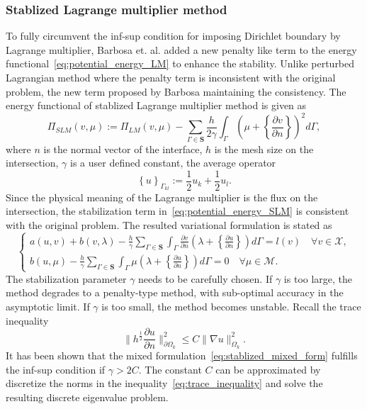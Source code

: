 \documentclass[preprint,12pt]{elsarticle}
\begin{document}
\subsubsection{Stablized Lagrange multiplier method}
To fully circumvent the inf-sup condition for imposing Dirichlet boundary by Lagrange multiplier, Barbosa et. al. \cite{barbosa1991finite} added a new penalty like term to the energy functional~\eqref{eq:potential_energy_LM} to enhance the stability. Unlike perturbed Lagrangian method where the penalty term is inconsistent with the original problem, the new term proposed by Barbosa maintaining the consistency. The energy functional of stablized Lagrange multiplier method is given as
\begin{equation}
    \Pi_{SLM}(v,\mu):=\Pi_{LM}(v,\mu)-\sum_{\Gamma\in\mathbf{S}}\frac{h}{2\gamma}\int_\Gamma(\mu+\left\{\frac{\partial{v}}{\partial{n}}\right\})^2d\Gamma,\label{eq:potential_energy_SLM}
\end{equation}
where $n$ is the normal vector of the interface, $h$ is the mesh size on the intersection, $\gamma$ is a user defined constant, the average operator
\begin{equation}
    \left\{u\right\}_{\Gamma_{kl}}:=\frac{1}{2}u_k+\frac{1}{2}u_l.
\end{equation}
Since the physical meaning of the Lagrange multiplier is the flux on the intersection, the stabilization term in~\eqref{eq:potential_energy_SLM} is consistent with the original problem. The resulted variational formulation is stated as
\begin{equation}
    \left\{
    \begin{array}{ll}
        a(u,v)+b(v,\lambda)-\frac{h}{\gamma}\sum_{\Gamma\in\mathbf{S}}\int_\Gamma\frac{\partial{v}}{\partial{n}}(\lambda+{\left\{\frac{\partial{u}}{\partial{n}}\right\}})d\Gamma=l(v) \quad \forall v\in{\mathcal{X}},\\
        b(u,\mu) - \frac{h}{\gamma}\sum_{\Gamma\in\mathbf{S}}\int_\Gamma\mu(\lambda+{\left\{\frac{\partial{u}}{\partial{n}}\right\}})d\Gamma=0 \quad \forall \mu\in{\mathcal{M}}.\label{eq:stablized_mixed_form}
    \end{array}
    \right.
\end{equation}
The stabilization parameter $\gamma$ needs to be carefully chosen. If $\gamma$ is too large, the method degrades to a penalty-type method, with sub-optimal accuracy in the asymptotic limit. If $\gamma$ is too small, the method becomes unstable. Recall the trace inequality
\begin{equation}
    \|h^{\frac{1}{2}}\frac{\partial{u}}{\partial{n}}\|_{\partial{\Omega_{k}}}^2\leq{C}\|\nabla{u}\|_{{\Omega_{k}}}^2.\label{eq:trace_inequality}
\end{equation}
It has been shown \cite{juntunen2015connection} that the mixed formulation~\eqref{eq:stablized_mixed_form} fulfills the inf-sup condition if $\gamma>2C$. The constant $C$ can be approximated by discretize the norms in the inequality~\eqref{eq:trace_inequality} and solve the resulting discrete eigenvalue problem. \par
\end{document}
